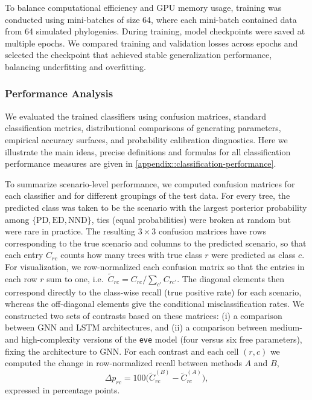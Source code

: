 {To balance computational efficiency and GPU memory usage, training was conducted using mini-batches of size 64, where each mini-batch contained data from 64 simulated phylogenies. During training, model checkpoints were saved at multiple epochs. We compared training and validation losses across epochs and selected the checkpoint that achieved stable generalization performance, balancing underfitting and overfitting.

\subsubsection{Performance Analysis}
\label{ch3::sec::methods::classification::performance}
We evaluated the trained classifiers using confusion matrices, standard classification metrics, distributional comparisons of generating parameters, empirical accuracy surfaces, and probability calibration diagnostics. Here we illustrate the main ideas, precise definitions and formulas for all classification performance measures are given in \autoref{appendix::classification-performance}.

To summarize scenario-level performance, we computed confusion matrices for each classifier and for different groupings of the test data. For every tree, the predicted class was taken to be the scenario with the largest posterior probability among \(\{\text{PD}, \text{ED}, \text{NND}\}\), ties (equal probabilities) were broken at random but were rare in practice. The resulting \(3\times 3\) confusion matrices have rows corresponding to the true scenario and columns to the predicted scenario, so that each entry \(C_{rc}\) counts how many trees with true class \(r\) were predicted as class \(c\). For visualization, we row-normalized each confusion matrix so that the entries in each row \(r\) sum to one, i.e.\ \(\tilde{C}_{rc} = C_{rc} / \sum_{c'} C_{rc'}\). The diagonal elements then correspond directly to the class-wise recall (true positive rate) for each scenario, whereas the off-diagonal elements give the conditional misclassification rates. We constructed two sets of contrasts based on these matrices: (i) a comparison between GNN and LSTM architectures, and (ii) a comparison between medium- and high-complexity versions of the \texttt{eve} model (four versus six free parameters), fixing the architecture to GNN. For each contrast and each cell \((r,c)\) we computed the change in row-normalized recall between methods \(A\) and \(B\),
\begin{equation}
\Delta p_{rc} = 100\bigl(\tilde{C}^{(B)}_{rc} - \tilde{C}^{(A)}_{rc}\bigr),
\end{equation}
expressed in percentage points. 

}
